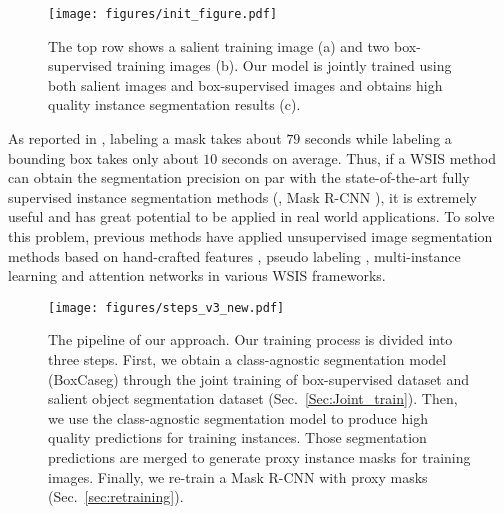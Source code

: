 \documentclass[final]{cvpr}
\begin{document}
\begin{figure}[thp]
\centering
\texttt{[image: figures/init\_figure.pdf]}
\caption{The top row shows a salient training image (a) and two box-supervised training images (b). Our model is jointly trained using both salient images and box-supervised images and obtains high quality instance segmentation results (c).}
\label{fig:first}
\end{figure}


As reported in \cite{bearman2016s}, labeling a mask takes about $79$ seconds while labeling a bounding box takes only about $10$ seconds on average. Thus, if a WSIS method can obtain the segmentation precision on par with the state-of-the-art fully supervised instance segmentation methods (\eg, Mask R-CNN \cite{he2017mask}), it is extremely useful and has great potential to be applied in real world applications. To solve this problem, previous methods have applied unsupervised image segmentation methods based on hand-crafted features \cite{rother2004grabcut,pont2016multiscale}, pseudo labeling \cite{dai2015boxsup,song2019box,arun2020weakly}, multi-instance learning \cite{hsu2019weakly} and attention networks \cite{kulharia12356box2seg} in various WSIS frameworks.

\begin{figure*}[htp]
\centering
\texttt{[image: figures/steps\_v3\_new.pdf]}
\caption{The pipeline of our approach. Our training process is divided into three steps. First, we obtain a class-agnostic segmentation model (BoxCaseg) through the joint training of box-supervised dataset and salient object segmentation dataset (Sec.~\ref{Sec:Joint_train}). Then, we use the class-agnostic segmentation model to produce high quality predictions for training instances. Those segmentation predictions are merged to generate proxy instance masks for training images. Finally, we re-train a Mask R-CNN with proxy masks (Sec.~\ref{sec:retraining}).}
\label{fig:framework}
\end{figure*}
\end{document}
